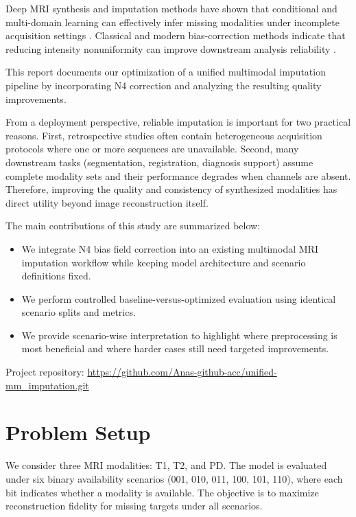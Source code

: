 \documentclass[conference]{IEEEtran}
\begin{document}
Deep MRI synthesis and imputation methods have shown that conditional and multi-domain learning can effectively infer missing modalities under incomplete acquisition settings \cite{shen2021,roy2010,iglesias2013,pan2018}. Classical and modern bias-correction methods indicate that reducing intensity nonuniformity can improve downstream analysis reliability \cite{sled1998,vovk2007,tustison2010n4,kanakaraj2024,dovrou2023}.

This report documents our optimization of a unified multimodal imputation pipeline by incorporating N4 correction and analyzing the resulting quality improvements.

From a deployment perspective, reliable imputation is important for two practical reasons. First, retrospective studies often contain heterogeneous acquisition protocols where one or more sequences are unavailable. Second, many downstream tasks (segmentation, registration, diagnosis support) assume complete modality sets and their performance degrades when channels are absent. Therefore, improving the quality and consistency of synthesized modalities has direct utility beyond image reconstruction itself.

The main contributions of this study are summarized below:
\begin{itemize}
\item We integrate N4 bias field correction into an existing multimodal MRI imputation workflow while keeping model architecture and scenario definitions fixed.
\item We perform controlled baseline-versus-optimized evaluation using identical scenario splits and metrics.
\item We provide scenario-wise interpretation to highlight where preprocessing is most beneficial and where harder cases still need targeted improvements.
\end{itemize}

Project repository: \url{https://github.com/Anas-github-acc/unified-mm_imputation.git}

\section{Problem Setup}
We consider three MRI modalities: T1, T2, and PD. The model is evaluated under six binary availability scenarios (001, 010, 011, 100, 101, 110), where each bit indicates whether a modality is available. The objective is to maximize reconstruction fidelity for missing targets under all scenarios.
\end{document}
